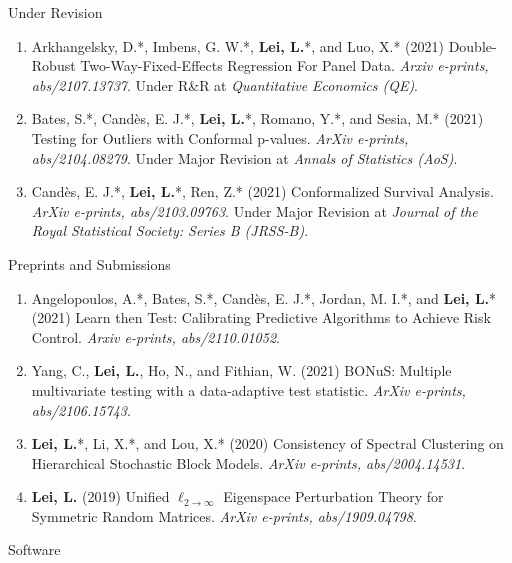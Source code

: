 \documentclass{article}
\begin{document}
\begin{large}
\noindent Under Revision
\end{large}

\begin{enumerate}
\item Arkhangelsky, D.*, Imbens, G. W.*, \textbf{Lei, L.}*, and Luo, X.* (2021) Double-Robust Two-Way-Fixed-Effects Regression For Panel Data. \emph{Arxiv e-prints, abs/2107.13737}. Under R\&R at \emph{Quantitative Economics (QE)}.
\item Bates, S.*, Cand\`{e}s, E. J.*, \textbf{Lei, L.}*, Romano, Y.*, and Sesia, M.* (2021) Testing for Outliers with Conformal p-values. \emph{ArXiv e-prints, abs/2104.08279}. Under Major Revision at \emph{Annals of Statistics (AoS)}.
\item Cand\`{e}s, E. J.*, \textbf{Lei, L.}*, Ren, Z.* (2021) Conformalized Survival Analysis. \emph{ArXiv e-prints, abs/2103.09763}. Under Major Revision at \emph{Journal of the Royal Statistical Society: Series B (JRSS-B)}.
\end{enumerate}

\begin{large}
\noindent Preprints and Submissions
\end{large}

\begin{enumerate}
\item Angelopoulos, A.*, Bates, S.*, Cand\`{e}s, E. J.*, Jordan, M. I.*, and \textbf{Lei, L.}* (2021) Learn then Test: Calibrating Predictive Algorithms to Achieve Risk Control. \emph{Arxiv e-prints, abs/2110.01052}.
\item Yang, C., \textbf{Lei, L.}, Ho, N., and Fithian, W. (2021) BONuS: Multiple multivariate testing with a data-adaptive test statistic. \emph{ArXiv e-prints, abs/2106.15743}.
\item \textbf{Lei, L.}*, Li, X.*, and Lou, X.* (2020) Consistency of Spectral Clustering on Hierarchical Stochastic Block Models. \emph{ArXiv e-prints, abs/2004.14531}.
\item \textbf{Lei, L.} (2019) Unified $\ell_{2\rightarrow\infty}$ Eigenspace Perturbation Theory for Symmetric Random Matrices. \emph{ArXiv e-prints, abs/1909.04798}.
\end{enumerate}

\begin{large}
\noindent Software
\end{large}
\end{document}
